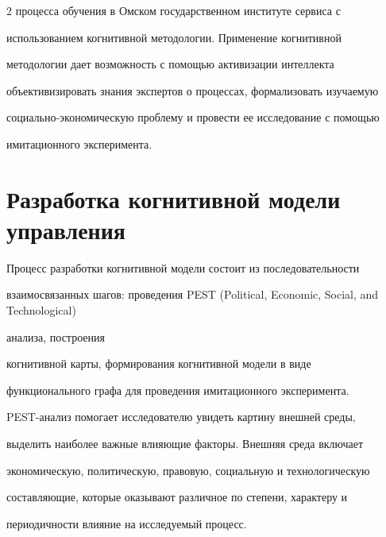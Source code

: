 \begin{multicols}{2}
процесса обучения в \mbox{Омском} государственном институте сервиса с 


использованием когнитивной методологии. Применение когнитивной 


методологии дает возможность с помощью активизации интеллекта 


объективизировать знания экспертов о процессах, формализовать изучаемую 


социально-экономическую проб\-ле\-му и провести ее исследование с помощью 


имитационного эксперимента. 


    


\section{Разработка когнитивной модели управления}


    


    Процесс разработки когнитивной модели состоит из последовательности 


взаимосвязанных шагов: проведения PEST (Political, Economic, Social, and Technological)


ана\-ли\-за, построения 


когнитивной карты, формирования когнитивной модели в виде 


функционального графа для проведения имитационного эксперимента. 


    


    PEST-анализ помогает исследователю увидеть картину внешней среды, 


выделить наиболее важные влияющие факторы. Внешняя среда включает 


экономическую, политическую, правовую, социальную и технологическую 


составляющие, которые оказывают различное по степени, характеру и 


периодичности влияние на исследуемый процесс. 





     \begin{table}\small


     \begin{center}


     \begin{tabular}{|c|l|l|c|}



\end{tabular}
\end{center}
\end{table}
\end{multicols}
